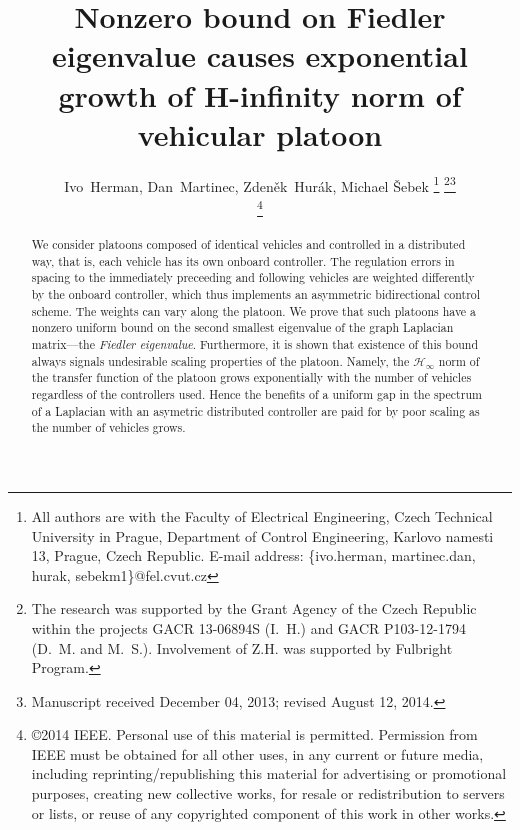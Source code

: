 \documentclass[technote, 10pt, twoside]{IEEEtran}
\theoremstyle{plain}
\theoremstyle{definition}
\theoremstyle{assump}
\begin{document}
\title{Nonzero bound on Fiedler eigenvalue causes exponential growth of
H-infinity norm of vehicular platoon}


\author{Ivo~Herman, Dan~Martinec,
        Zden\v{e}k~Hur\'{a}k, Michael \v{S}ebek
\thanks{All authors are with the Faculty of Electrical Engineering, Czech
Technical University in Prague, Department of Control Engineering, Karlovo
namesti 13, Prague, Czech Republic.
E-mail address:
\{ivo.herman, martinec.dan, hurak, sebekm1\}@fel.cvut.cz} \thanks{The research
was supported by the Grant Agency of the Czech Republic within the projects GACR 13-06894S (I.~H.) and GACR P103-12-1794 (D.~M. and M.~S.). Involvement of Z.H. was supported by Fulbright Program.
}\thanks{Manuscript received December 04, 2013; revised August 12, 2014.}

\thanks{\copyright 2014 IEEE. Personal use of this material is permitted.
Permission from IEEE must be obtained for all other uses, in any current or future media, including reprinting/republishing this material for advertising or promotional purposes, creating new collective works, for resale or redistribution to servers or lists, or reuse of any copyrighted component of this work in other works.}}
  
 


\maketitle

\begin{abstract} 
We consider platoons composed of identical vehicles and controlled in a
distributed way, that is, each vehicle has its own onboard controller. The
regulation errors in spacing to the immediately preceeding and following
vehicles are weighted differently by the onboard controller, which thus implements an
asymmetric bidirectional control scheme. The weights can vary along the platoon.
We prove that such platoons have a nonzero uniform bound on the second smallest
eigenvalue of the graph Laplacian matrix---the \textit{Fiedler eigenvalue}.
Furthermore, it is shown that existence of this bound always signals undesirable
scaling properties of the platoon. Namely, the $\mathcal{H}_\infty$ norm of the
transfer function of the platoon grows exponentially with the number of vehicles
regardless of the controllers used.
Hence the benefits of a uniform gap in the spectrum of a Laplacian with an
asymetric distributed controller 
are paid for by
poor scaling as the number of vehicles grows.
\end{abstract}
\end{document}
